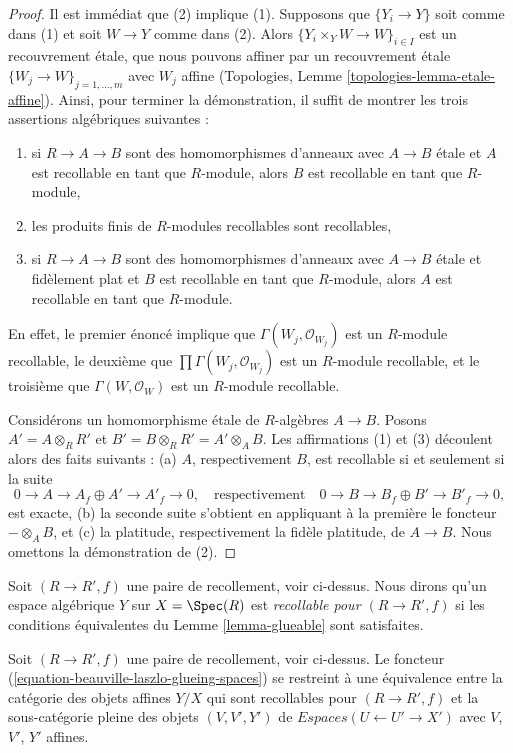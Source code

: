 \begin{proof}
Il est immédiat que (2) implique (1). Supposons que $\{Y_i \to Y\}$
soit comme dans (1) et soit $W \to Y$ comme dans (2). Alors
$\{Y_i \times_Y W \to W\}_{i \in I}$ est un recouvrement \'etale,
que nous pouvons affiner par un recouvrement \'etale
$\{W_j \to W\}_{j = 1, \ldots, m}$ avec $W_j$ affine
(Topologies, Lemme \ref{topologies-lemma-etale-affine}).
Ainsi, pour terminer la démonstration, il suffit de montrer
les trois assertions algébriques suivantes :
\begin{enumerate}
\item si $R \to A \to B$ sont des homomorphismes d'anneaux avec $A \to B$ \'etale
et $A$ est recollable en tant que $R$-module, alors $B$ est recollable en tant que
$R$-module,
\item les produits finis de $R$-modules recollables sont recollables,
\item si $R \to A \to B$ sont des homomorphismes d'anneaux avec $A \to B$ \'etale et fidèlement plat
et $B$ est recollable en tant que $R$-module, alors $A$ est recollable en tant que $R$-module.  
\end{enumerate}
  
En effet, le premier énoncé implique que $\Gamma(W_j, \mathcal{O}_{W_j})$ est un $R$-module recollable, le deuxième que $\prod \Gamma(W_j, \mathcal{O}_{W_j})$ est un $R$-module recollable, et le troisième que $\Gamma(W, \mathcal{O}_W)$ est un $R$-module recollable.

\medskip\noindent
Considérons un homomorphisme \'etale de $R$-algèbres $A \to B$. Posons $A' = A \otimes_R R'$ et $B' = B \otimes_R R' = A' \otimes_A B$.
Les affirmations (1) et (3) découlent alors des faits suivants :
(a) $A$, respectivement $B$, est recollable si et seulement si la suite $$
0 \to A \to A_f \oplus A' \to A'_f \to 0,
\quad\text{respectivement}\quad
0 \to B \to B_f \oplus B' \to B'_f \to 0,
$$
est exacte, (b) la seconde suite s'obtient en appliquant à la première le foncteur $- \otimes_A B$, et (c) la platitude, respectivement la fidèle platitude, de $A \to B$. Nous omettons la démonstration de (2).
\end{proof}

\noindent
Soit $(R \to R', f)$ une paire de recollement, voir ci-dessus.
Nous dirons qu'un espace algébrique $Y$ sur $X = \Spec(R)$
est {\it recollable pour $(R \to R', f)$}
si les conditions équivalentes du Lemme \ref{lemma-glueable}
sont satisfaites.

\begin{lemma}
\label{lemma-glueing-affines}
Soit $(R \to R', f)$ une paire de recollement, voir ci-dessus.
Le foncteur (\ref{equation-beauville-laszlo-glueing-spaces})
se restreint à une équivalence entre la catégorie des objets affines
$Y/X$ qui sont recollables pour $(R \to R', f)$ et la
sous-catégorie pleine des objets $(V, V', Y')$ de
$\textit{Espaces}(U \leftarrow U' \to X')$
avec $V$, $V'$, $Y'$ affines.
\end{lemma}

